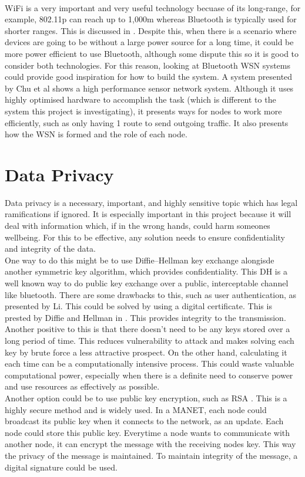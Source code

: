 \documentclass{report}
\begin{document}
\bigskip\\
WiFi is a very important and very useful technology becuase of its long-range, for example, 802.11p can reach up to 1,000m \cite{abdelgader2014physical} whereas Bluetooth
is typically used for shorter ranges. This is discussed in \cite{bhagwat2001bluetooth}. Despite this, when there is a scenario 
where devices are going to be without a large power source for a long time, it could be more power efficient to use Bluetooth\cite{putra2017comparison}, although some 
dispute this \cite{friedman2012power} so it is good to consider both technologies. For this reason, looking at Bluetooth WSN systems could provide good inspiration for 
how to build the system. A system presented by Chu et al \cite{chu2010design} shows a high performance sensor network system. Although it uses highly optimised hardware 
to accomplish the task (which is different to the system this project is investigating), it presents ways for nodes to work more efficiently, such as only having 1 
route to send outgoing traffic. It also presents how the WSN is formed and the role of each node. 

\section*{Data Privacy}

Data privacy is a necessary, important, and highly sensitive topic which has legal ramifications if ignored. It is especially important in this project because it will 
deal with information which, if in the wrong hands, could harm someones wellbeing. For this to be effective, any solution needs to ensure confidentiality and integrity of the data.
\bigskip\\
One way to do this might be to use Diffie–Hellman key exchange\cite{li2010research} \cite{diffie1976new} alongisde another symmetric key algorithm, which provides confidentiality. This DH is a well known way to do public key exchange over 
a public, interceptable channel like bluetooth. There are some drawbacks to this, such as user authentication, as presented by Li. This could be solved by using a digital 
certificate. This is prested by Diffie and Hellman in \cite{diffie1976new}. This provides integrity to the transmission. Another positive to this is that there doesn't need to be any keys stored over a long period of time. This reduces vulnerability to attack and makes solving 
each key by brute force a less attractive prospect. On the other hand, calculating it each time can be a computationally intensive process. This could waste valuable 
computational power, especially when there is a definite need to conserve power and use resources as effectively as possible. 
\bigskip\\
Another option could be to use public key encryption, such as RSA \cite{aufa2018security}. This is a highly secure method and is widely used. In a MANET, each node could 
broadcast its public key when it connects to the network, as an update. Each node could store this public key. Everytime a node wants to communicate with another node, it can 
encrypt the message with the receiving nodes key. This way the privacy of the message is maintained. To maintain integrity of the message, a digital signature could be 
used. 
\end{document}
